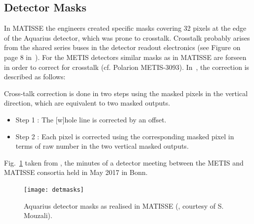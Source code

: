 

\subsection{Detector Masks}\label{ssec:criticaldetetctormasks}

In MATISSE the engineers created specific masks covering 32 pixels at the edge of the Aquarius detector, which was prone to crosstalk.
Crosstalk probably arises from the shared series buses in the detector readout electronics (see Figure on page 8 in~\cite{matisse_minutes}).
For the METIS detectors similar masks as in MATISSE are forseen in order to correct for crosstalk (cf. Polarion METIS-3093).
In~\cite{matisse_minutes}, the correction is described as follows:

\begin{displayquote}
    Cross-talk correction is done in two steps using the masked pixels in the vertical direction, which are equivalent to two masked outputs.
    \begin{itemize}
        \item Step 1 : The [w]hole line is corrected by an offset.
        \item Step 2 : Each pixel is corrected using the corresponding masked pixel in terms of raw
            number in the two vertical masked outputs.
    \end{itemize}
\end{displayquote}

Fig.~\ref{fig:detmasks} taken from \cite{matisse_minutes}, the minutes
of a detector meeting between the METIS and MATISSE consortia held in May 2017 in Bonn.
\begin{figure}[ht]
  \centering
  \texttt{[image: detmasks]}
  \caption[Aquarius detector masks]{Aquarius detector masks as
    realised in MATISSE (\cite{matisse_minutes}, courtesy of
    S. Mouzali).}
  \label{fig:detmasks}
\end{figure}




